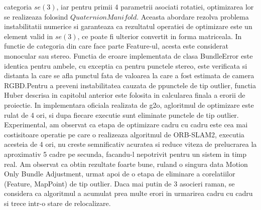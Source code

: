 \documentclass[12pt,a4paper]{report}
\begin{document}
categoria $ se(3) $, iar pentru primii 4 parametrii asociati rotatiei, optimizarea lor se realizeaza
folosind $ QuaternionManifold $. Aceasta abordare rezolva problema instabilitatii numerice si 
garanteaza ca rezultatul operatiei de optimizare este un element valid in $ se(3) $, ce poate fi 
ulterior convertit in forma matriceala. In functie de categoria din care face parte Feature-ul, 
acesta este considerat monocular sau stereo. Functia de eroare implementata de clasa BundleError 
este identica pentru ambele, cu exceptia ca pentru punctele stereo, este verificata si distanta 
la care se afla punctul fata de valoarea la care a fost estimata de camera RGBD.\@ Pentru a preveni
instabilitatea cauzata de ppunctele de tip outlier, functia Huber descrisa in capitolul anterior este
folosita in calcularea finala a erorii de proiectie. In implementara oficiala realizata de g2o, 
agloritmul de optimizare este rulat de 4 ori, si dupa fiecare executie sunt eliminate punctele de tip 
outlier. Experimental, am observat ca etapa de optimizare cadru cu cadru este cea mai costisitoare 
operatie pe care o realizeaza algoritmul de ORB-SLAM2, executia acesteia de 4 ori, nu creste 
semnificativ acuratea si reduce viteza de prelucrarea la aproximativ 5 cadre pe secunda, facandu-l 
nepotrivit pentru un sistem in timp real. Am observat ca obtin rezultate foarte bune, ruland o singura
data Motion Only Bundle Adjustment, urmat apoi de o etapa de eliminare a corelatiilor 
(Feature, MapPoint) de tip outlier. Daca mai putin de 3 asocieri raman, se considera ca algoritmul
a acumulat prea multe erori in urmarirea cadru cu cadru si trece intr-o stare de relocalizare. \\
\end{document}
